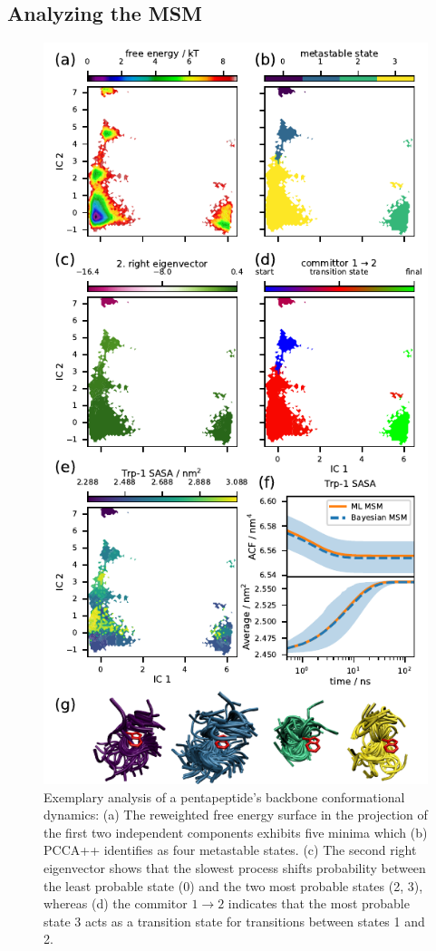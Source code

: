 \documentclass[9pt,tutorial]{livecoms}
\begin{document}
\subsection{Analyzing the MSM}

\begin{figure}
\includegraphics{figure_2}
\caption{Exemplary analysis of a pentapeptide's backbone conformational dynamics: (a) The reweighted free energy surface in the projection of the first two independent components exhibits five minima which (b) PCCA++ identifies as four metastable states. (c) The second right eigenvector shows that the slowest process shifts probability between the least probable state (0) and the two most probable states (2, 3), whereas (d) the commitor $1\to2$ indicates that the most probable state 3 acts as a transition state for transitions between states 1 and 2.}
\label{fig:msm-analysis}
\end{figure}
\end{document}
